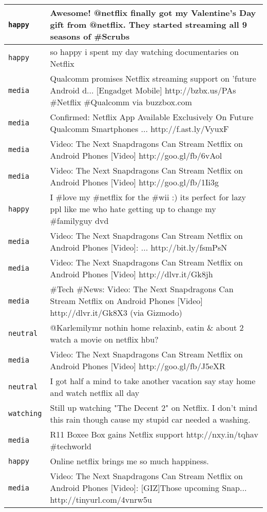 {\begin{longtable}{|l|p{160mm}|}
      \tabularnewline\hline
         \texttt{happy} & Awesome! @netflix finally got my Valentine's Day gift from @netflix. They started streaming all 9 seasons of \#Scrubs
      \tabularnewline\hline
         \texttt{happy} & so happy i spent my day watching documentaries on Netflix
      \tabularnewline\hline
         \texttt{media} & Qualcomm promises Netflix streaming support on 'future Android d... [Engadget Mobile] http://bzbx.us/PAs \#Netflix \#Qualcomm via buzzbox.com
      \tabularnewline\hline
         \texttt{media} & Confirmed: Netflix App Available Exclusively On Future Qualcomm Smartphones ... http://f.ast.ly/VyuxF
      \tabularnewline\hline
         \texttt{media} & Video: The Next Snapdragons Can Stream Netflix on Android Phones [Video] http://goo.gl/fb/6vAol
      \tabularnewline\hline
         \texttt{media} & Video: The Next Snapdragons Can Stream Netflix on Android Phones [Video] http://goo.gl/fb/1Ii3g
      \tabularnewline\hline
         \texttt{happy} & I \#love my \#netflix for the \#wii :) its perfect for lazy ppl like me who hate getting up to change my \#familyguy dvd
      \tabularnewline\hline
         \texttt{media} & Video: The Next Snapdragons Can Stream Netflix on Android Phones [Video]:								... http://bit.ly/fsmPsN
      \tabularnewline\hline
         \texttt{media} & Video: The Next Snapdragons Can Stream Netflix on Android Phones [Video] http://dlvr.it/Gk8jh
      \tabularnewline\hline
         \texttt{media} & \#Tech \#News: Video: The Next Snapdragons Can Stream Netflix on Android Phones [Video] http://dlvr.it/Gk8X3 (via Gizmodo)
      \tabularnewline\hline
         \texttt{neutral} & @Karlemilymr nothin home relaxinb, eatin \& about 2 watch a movie on netflix hbu?
      \tabularnewline\hline
         \texttt{media} & Video: The Next Snapdragons Can Stream Netflix on Android Phones [Video] http://goo.gl/fb/J5eXR
      \tabularnewline\hline
         \texttt{neutral} & I got half a mind to take another vacation say stay home and watch netflix all day
      \tabularnewline\hline
         \texttt{watching} & Still up watching "The Decent 2" on Netflix. I don't mind this rain though cause my stupid car needed a washing.
      \tabularnewline\hline
         \texttt{media} & R11 Boxee Box gains Netflix support http://nxy.in/tqhav \#techworld
      \tabularnewline\hline
         \texttt{happy} & Online netflix brings me so much happiness.
      \tabularnewline\hline
         \texttt{media} & Video: The Next Snapdragons Can Stream Netflix on Android Phones [Video]: [GIZ]Those upcoming Snap... http://tinyurl.com/4vnrw5u
      \tabularnewline\hline

\end{longtable}}
